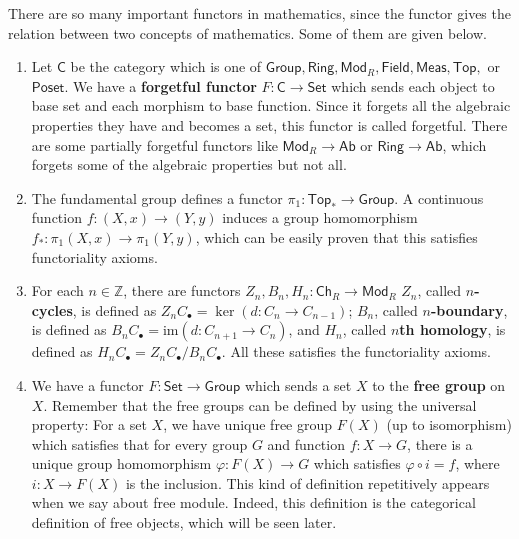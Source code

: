 \begin{exmp} There are so many important functors in mathematics, since the functor gives the relation between two concepts of mathematics. Some of them are given below.
\begin{enumerate}
\item Let $\mathsf{C}$ be the category which is one of $\mathsf{Group}, \mathsf{Ring}, \mathsf{Mod}_R, \mathsf{Field}, \mathsf{Meas}, \mathsf{Top},$ or $\mathsf{Poset}$. We have a \textbf{forgetful functor} $F:\mathsf{C}\rightarrow\mathsf{Set}$ which sends each object to base set and each morphism to base function. Since it forgets all the algebraic properties they have and becomes a set, this functor is called forgetful. There are some partially forgetful functors like $\mathsf{Mod}_R\rightarrow \mathsf{Ab}$ or $\mathsf{Ring}\rightarrow \mathsf{Ab}$, which forgets some of the algebraic properties but not all.
\item The fundamental group defines a functor $\pi_1:\mathsf{Top}_*\rightarrow\mathsf{Group}$. A continuous function $f:(X,x)\rightarrow (Y,y)$ induces a group homomorphism $f_*:\pi_1(X,x)\rightarrow \pi_1(Y,y)$, which can be easily proven that this satisfies functoriality axioms.
\item For each $n\in \mathbb{Z}$, there are functors $Z_n, B_n, H_n:\mathsf{Ch}_R\rightarrow \mathsf{Mod}_R$ $Z_n$, called \textbf{$n$-cycles}, is defined as $Z_n C_{\bullet}=\ker(d:C_n\rightarrow C_{n-1})$; $B_n$, called \textbf{$n$-boundary}, is defined as $B_n C_{\bullet}=\mathrm{im}(d:C_{n+1}\rightarrow C_n)$, and $H_n$, called \textbf{$n$th homology}, is defined as $H_n C_{\bullet}=Z_n C_{\bullet}/B_n C_{\bullet}$. All these satisfies the functoriality axioms.
\item We have a functor $F:\mathsf{Set}\rightarrow \mathsf{Group}$ which sends a set $X$ to the \textbf{free group} on $X$. Remember that the free groups can be defined by using the universal property: For a set $X$, we have unique free group $F(X)$ (up to isomorphism) which satisfies that for every group $G$ and function $f:X\rightarrow G$, there is a unique group homomorphism $\varphi:F(X)\rightarrow G$ which satisfies $\varphi \circ i=f$, where $i:X\rightarrow F(X)$ is the inclusion. This kind of definition repetitively appears when we say about free module. Indeed, this definition is the categorical definition of free objects, which will be seen later.
\end{enumerate}
\end{exmp}

